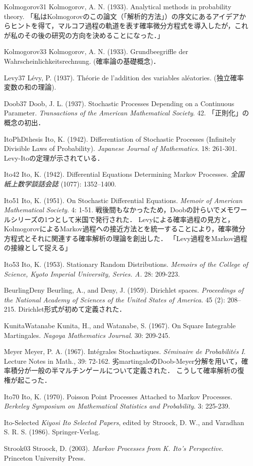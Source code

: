 \documentclass[uplatex,dvipdfmx]{jsreport}
\begin{document}
\begin{thebibliography}{99}
    \item{Kolmogorov31}
    Kolmogorov, A. N. (1933). Analytical methods in probability theory. 「私はKolmogorovのこの論文（「解析的方法」）の序文にあるアイデアからヒントを得て，マルコフ過程の軌道を表す確率微分方程式を導入したが，これが私のその後の研究の方向を決めることになった．」
    \item{Kolmogorov33}
    Kolmogorov, A. N. (1933). Grundbeegriffle der Wahrscheinlichkeitsrechnung. (確率論の基礎概念)．
    \item{Levy37}
    Lévy, P. (1937). Théorie de l'addition des variables aléatories. (独立確率変数の和の理論).
    \item{Doob37}
    Doob, J. L. (1937). Stochastic Processes Depending on a Continuous Parameter. \textit{Transactions of the American Mathematical Society}. 42. 「正則化」の概念の初出．
    \item{ItoPhDthesis}
    Ito, K. (1942). Diﬀerentiation of Stochastic Processes (Infinitely Divisible Laws of Probability). \textit{Japanese Journal of Mathematics}. 18: 261-301. Levy-Itoの定理が示されている．
    \item{Ito42}
    Ito, K. (1942). Differential Equations Determining Markov Processes. \textit{全国紙上数学談話会誌} (1077): 1352–1400.
    \item{Ito51}
    Ito, K. (1951). On Stochastic Differential Equations. \textit{Memoir of American Mathematical Society}. 4: 1-51. 戦後間もなかったため，Doobの計らいでメモワールシリーズの1つとして米国で発行された．
    Levyによる確率過程の見方と，KolmogorovによるMarkov過程への接近方法とを統一することにより，確率微分方程式とそれに関連する確率解析の理論を創出した．
    「Levy過程をMarkov過程の接線として捉える」
    \item{Ito53}
    Ito, K. (1953). Stationary Random Distributions. \textit{Memoirs of the College of Science, Kyoto Imperial University, Series. A.} 28: 209-223.
    \item{BeurlingDeny}
    Beurling, A., and Deny, J. (1959). Dirichlet spaces. \textit{Proceedings of the National Academy of Sciences of the United States of America}. 45 (2): 208–215. Dirichlet形式が初めて定義された．
    \item{KunitaWatanabe}
    Kunita, H., and Watanabe, S. (1967). On Square Integrable Martingales. \textit{Nagoya Mathematics Journal}. 30: 209-245.
    \item{Meyer}
    Meyer, P. A. (1967). Intégrales Stochastiques. \textit{Séminaire de Probabilités I}. Lecture Notes in Math., 39: 72-162. 劣martingaleのDoob-Meyer分解を用いて，確率積分が一般の半マルチンゲールについて定義された．
    こうして確率解析の復権が起こった．
    \item{Ito70}
    Ito, K. (1970). Poisson Point Processes Attached to Markov Processes. \textit{Berkeley Symposium on Mathematical Statistics and Probability}. 3: 225-239.
    \item{Ito-Selected}
    \textit{Kiyosi Ito Selected Papers}, edited by Stroock, D. W., and Varadhan S. R. S. (1986). Springer-Verlag.
    \item{Strook03}
    Stroock, D. (2003). \textit{Markov Processes from K. Ito's Perspective}. Princeton University Press.
    

\end{thebibliography}
\end{document}

